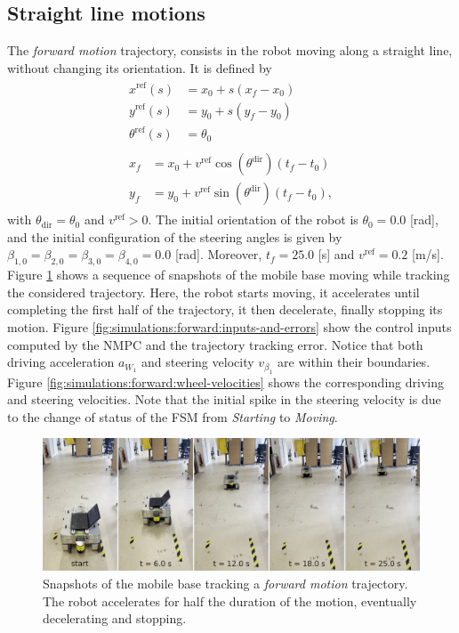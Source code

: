 \subsection{Straight line motions}
The \textit{forward motion} trajectory, consists in the robot moving along a
straight line, without changing its orientation. It is defined by
\begin{equation*}
\renewcommand{\arraystretch}{1.3}
\begin{array}{c}
    \begin{aligned}
        x^{\mathrm{ref}}(s) &= x_0 + s (x_f - x_0) \\
        y^{\mathrm{ref}}(s) &= y_0 + s (y_f - y_0) \\
        \theta^{\mathrm{ref}}(s) &= \theta_0
    \end{aligned}  \\
    \begin{aligned}
        x_f &= x_0 + v^{\mathrm{ref}} \cos(\theta^{\mathrm{dir}}) (t_f - t_0) \\
        y_f &= y_0 + v^{\mathrm{ref}} \sin(\theta^{\mathrm{dir}}) (t_f - t_0),
     \end{aligned}
\end{array}
\end{equation*}
with $\theta_{\mathrm{dir}}=\theta_0$ and $v^{\mathrm{ref}}>0$.
The initial orientation of the robot is $\theta_0=0.0$ [rad], and the
initial configuration of the steering angles is given by
$\beta_{1,0}=\beta_{2,0}=\beta_{3,0}=\beta_{4,0}=0.0$ [rad].
Moreover, $t_f = 25.0$ [s] and $v^{\mathrm{ref}}=0.2$ [m/s].
Figure \ref{fig:experiments:forward:snapshots} shows a sequence of snapshots
of the mobile base moving while tracking the considered trajectory. Here, the 
robot starts moving, it accelerates until completing the first half of the
trajectory, it then decelerate, finally stopping its motion.
Figure \ref{fig:simulations:forward:inputs-and-errors} show the control inputs 
computed by the NMPC and the trajectory tracking error. Notice that both 
driving acceleration $a_{W_1}$ and steering velocity $v_{\beta_1}$ are within 
their boundaries.
Figure \ref{fig:simulations:forward:wheel-velocities} shows the corresponding
driving and steering velocities. Note that the initial spike in the 
steering velocity is due to the change of status of the FSM from \textit{Starting}
to \textit{Moving}.
\begin{figure}
    \centering
    \includegraphics[width=\textwidth]{figures/SWMR/simulations/forward/snapshots.jpeg}
    \caption{Snapshots of the mobile base tracking a \textit{forward motion} trajectory.
        The robot accelerates for half the duration of the motion, eventually
        decelerating and stopping.}
    \label{fig:experiments:forward:snapshots}
\end{figure}
